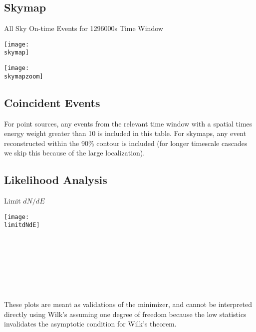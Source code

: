 \documentclass[titlepage]{article}
\begin{document}
\pagebreak
\subsection{Skymap}

{
  \centering
  {\Large All Sky On-time Events for 1296000s Time Window}

  \texttt{[image: \\skymap]}

  \texttt{[image: \\skymapzoom]}

}
\pagebreak

\subsection{Coincident Events}
For point sources, any events from the relevant time window with a spatial times energy weight greater than 10 is included in this table. For skymaps, any event reconstructed within the 90\% contour is included (for longer timescale cascades we skip this because of the large localization).
\event

\subsection{Likelihood Analysis}
\results
\pagebreak

\backgroundpdfplot

\survivialfunctionplot

\pagebreak
{
  \centering

  {\Large Limit $dN/dE$}

  \texttt{[image: \\limitdNdE]}
  \\
  \\

  \tsd

  \\
  \\
  \upperlim

  \\
  \\
  \nsscan

  These plots are meant as validations of the minimizer, and cannot be interpreted directly using Wilk's assuming one degree of freedom because the low statistics invalidates the asymptotic condition for Wilk's theorem.
}

\vfill
\end{document}
